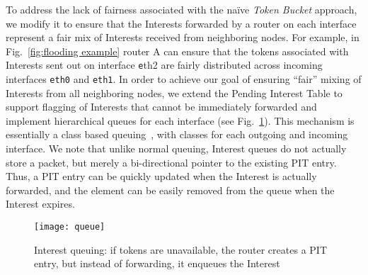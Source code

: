 To address the lack of fairness associated with the na\"ive {\it Token Bucket} approach, we modify it to ensure that the Interests forwarded by a router on each interface represent a fair mix of Interests received from neighboring nodes. For example, in Fig.~\ref{fig:flooding example} router A can ensure that the tokens associated with Interests sent out on interface {\texttt eth2}  are fairly distributed across incoming interfaces \texttt{eth0} and \texttt{eth1}. 
In order to achieve our goal of ensuring ``fair'' mixing of Interests from all neighboring nodes, 
we extend the Pending Interest Table to support flagging of Interests that cannot be immediately forwarded and implement hierarchical queues for each interface (see Fig.~\ref{fig:queueing}). 
This mechanism is essentially a class based queuing~\cite{floyd1995link}, with classes for each outgoing and incoming interface.
We note that unlike normal queuing, Interest queues do not actually store a packet, but merely a bi-directional pointer to the existing PIT entry.
Thus, a PIT entry can be quickly updated when the Interest is actually forwarded, and the element can be easily removed from the queue when the Interest expires.


\begin{figure}[thb]
  \centering
  \texttt{[image: queue]}
  \vspace{-0.7cm}
  \caption{Interest queuing: if tokens are unavailable, the router creates a PIT entry, but instead of forwarding, it enqueues the Interest}
  \label{fig:queueing}
\end{figure}

